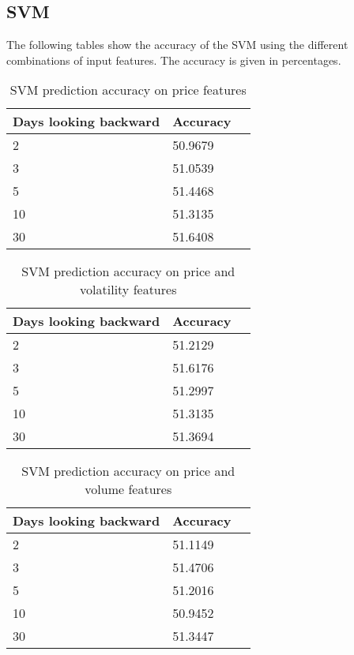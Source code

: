 \documentclass{article}
\begin{document}
\subsection{SVM}
The following tables show the accuracy of the SVM using the different combinations of input features. The accuracy is given in percentages.
\begin{table}[!h]
\begin{center}
    \begin{tabular}{ | l | l | p{3cm} |}
    \hline
    Days looking backward & Accuracy \\ \hline
    2 & 50.9679  \\ \hline
    3 & 51.0539  \\ \hline
    5 & 51.4468  \\ \hline
    10 & 51.3135  \\ \hline
    30 & 51.6408 \\ 
    \hline
    \end{tabular}
\caption{SVM prediction accuracy on price features}
\end{center}
\end{table}

\begin{table}[!h]
\begin{center}
    \begin{tabular}{ | l | l | p{3cm} |}
    \hline
    Days looking backward & Accuracy \\ \hline
    2 & 51.2129  \\ \hline
    3 & 51.6176  \\ \hline
    5 & 51.2997  \\ \hline
    10 & 51.3135  \\ \hline
    30 & 51.3694 \\ 
    \hline
    \end{tabular}
\caption{SVM prediction accuracy on price and volatility features}
\end{center}
\end{table}

\begin{table}[!h]
\begin{center}
    \begin{tabular}{ | l | l | p{3cm} |}
    \hline
    Days looking backward & Accuracy \\ \hline
    2 & 51.1149  \\ \hline
    3 & 51.4706  \\ \hline
    5 & 51.2016  \\ \hline
    10 & 50.9452  \\ \hline
    30 & 51.3447 \\ 
    \hline
    \end{tabular}
\caption{SVM prediction accuracy on price and volume features}
\end{center}
\end{table}
\end{document}
